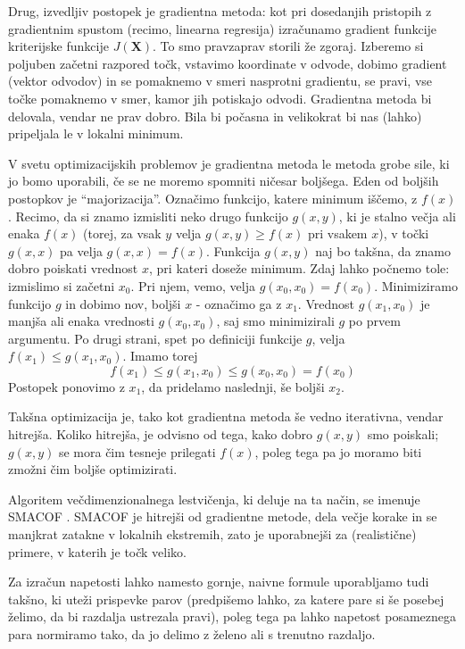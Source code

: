 Drug, izvedljiv postopek je gradientna metoda: kot pri dosedanjih pristopih z gradientnim spustom (recimo, linearna regresija) izračunamo gradient funkcije kriterijske funkcije $J(\mathbf{X})$. To smo pravzaprav storili že zgoraj. Izberemo si poljuben začetni razpored točk, vstavimo koordinate v odvode, dobimo gradient (vektor odvodov) in se pomaknemo v smeri nasprotni gradientu, se pravi, vse točke pomaknemo v smer, kamor jih potiskajo odvodi. Gradientna metoda bi delovala, vendar ne prav dobro. Bila bi počasna in velikokrat bi nas (lahko) pripeljala le v lokalni minimum.

V svetu optimizacijskih problemov je gradientna metoda le metoda grobe sile, ki jo bomo uporabili, če se ne moremo spomniti ničesar boljšega. Eden od boljših postopkov je ``majorizacija''. Označimo funkcijo, katere minimum iščemo, z $f(x)$. Recimo, da si znamo izmisliti neko drugo funkcijo $g(x, y)$, ki je stalno večja ali enaka $f(x)$ (torej, za vsak $y$ velja $g(x, y)\ge f(x)$ pri vsakem $x$), v točki $g(x, x)$ pa velja $g(x, x)=f(x)$. Funkcija $g(x, y)$ naj bo takšna, da znamo dobro poiskati vrednost $x$, pri kateri doseže minimum. Zdaj lahko počnemo tole: izmislimo si začetni $x_0$. Pri njem, vemo, velja $g(x_0, x_0)=f(x_0)$. Minimiziramo funkcijo $g$ in dobimo nov, boljši $x$ - označimo ga z $x_1$. Vrednost $g(x_1, x_0)$ je manjša ali enaka vrednosti $g(x_0, x_0)$, saj smo minimizirali $g$ po prvem argumentu. Po drugi strani, spet po definiciji funkcije $g$, velja $f(x_1) \le g(x_1, x_0)$. Imamo torej
$$f(x_1) \le g(x_1, x_0) \le g(x_0, x_0) = f(x_0)$$
Postopek ponovimo z $x_1$, da pridelamo naslednji, še boljši $x_2$.

Takšna optimizacija je, tako kot gradientna metoda še vedno iterativna, vendar hitrejša. Koliko hitrejša, je odvisno od tega, kako dobro $g(x, y)$ smo poiskali; $g(x, y)$ se mora čim tesneje prilegati $f(x)$, poleg tega pa jo moramo biti zmožni čim boljše optimizirati.

Algoritem večdimenzionalnega lestvičenja, ki deluje na ta način, se imenuje SMACOF . SMACOF je hitrejši od gradientne metode, dela večje korake in se manjkrat zatakne v lokalnih ekstremih, zato je uporabnejši za (realistične) primere, v katerih je točk veliko.

Za izračun napetosti lahko namesto gornje, naivne formule uporabljamo tudi takšno, ki uteži prispevke parov (predpišemo lahko, za katere pare si še posebej želimo, da bi razdalja ustrezala pravi), poleg tega pa lahko napetost posameznega para normiramo tako, da jo delimo z želeno ali s trenutno razdaljo.

